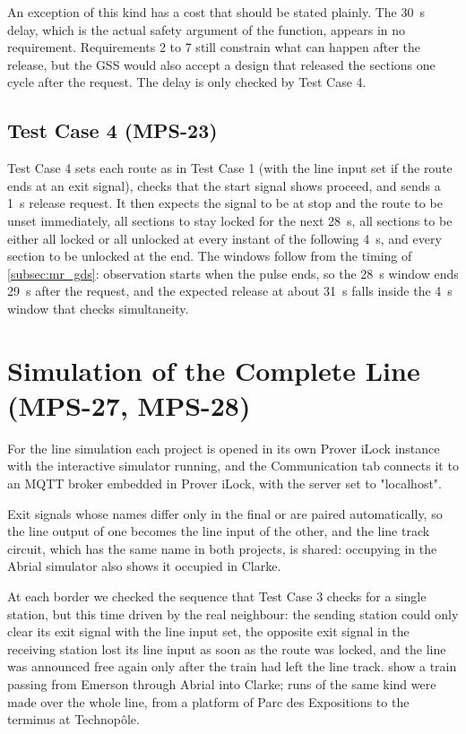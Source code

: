 \documentclass[a4paper,12pt]{article}
\newcommand{\code}[1]{\texttt{\detokenize{#1}}}
\begin{document}
An exception of this kind has a cost that should be stated plainly. The 30~s delay, which is the actual safety argument of the function, appears in no requirement. Requirements 2 to 7 still constrain what can happen after the release, but the GSS would also accept a design that released the sections one cycle after the request. The delay is only checked by Test Case 4.

\subsection{Test Case 4 (MPS-23)}
\label{subsec:tc4}

Test Case 4 sets each route as in Test Case 1 (with the line input set if the route ends at an exit signal), checks that the start signal shows proceed, and sends a 1~s release request. It then expects the signal to be at stop and the route to be unset immediately, all sections to stay locked for the next 28~s, all sections to be either all locked or all unlocked at every instant of the following 4~s, and every section to be unlocked at the end. The windows follow from the timing of \cref{subsec:mr_gds}: observation starts when the pulse ends, so the 28~s window ends 29~s after the request, and the expected release at about 31~s falls inside the 4~s window that checks simultaneity.

\section{Simulation of the Complete Line (MPS-27, MPS-28)}
\label{sec:simulation}

For the line simulation each project is opened in its own Prover iLock instance with the interactive simulator running, and the Communication tab connects it to an MQTT broker embedded in Prover iLock, with the server set to "localhost".

Exit signals whose names differ only in the final \code{E} or \code{W} are paired automatically, so the line output of one becomes the line input of the other, and the line track circuit, which has the same name in both projects, is shared: occupying \code{VG1-ABR} in the Abrial simulator also shows it occupied in Clarke.

At each border we checked the sequence that Test Case 3 checks for a single station, but this time driven by the real neighbour: the sending station could only clear its exit signal with the line input set, the opposite exit signal in the receiving station lost its line input as soon as the route was locked, and the line was announced free again only after the train had left the line track.  show a train passing from Emerson through Abrial into Clarke; runs of the same kind were made over the whole line, from a platform of Parc des Expositions to the terminus at Technop\^ole.
\end{document}
